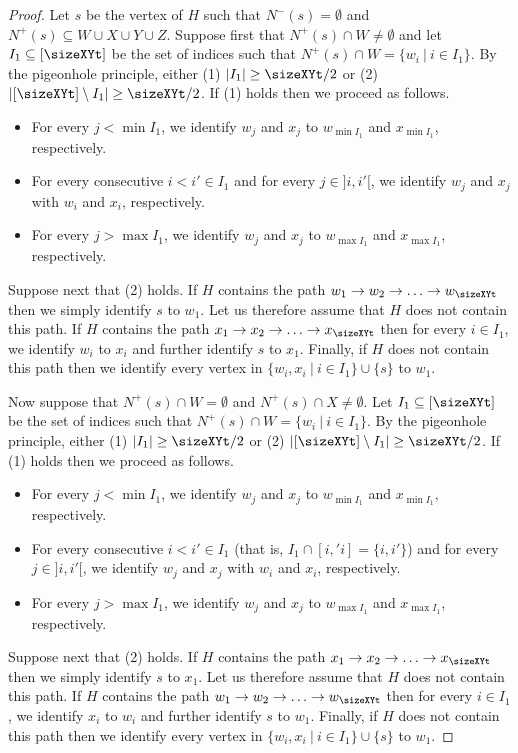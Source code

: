 \begin{proof}
Let $s$ be the vertex of $H$ such that $N^-(s) = \emptyset$ and $N^+(s) \subseteq W \cup X \cup Y \cup Z$.
Suppose first that $N^+(s) \cap W \neq \emptyset$ and let $I_1 \subseteq [\sizeXYt]$ be the set of indices such that $N^+(s) \cap W = \{w_i~|~i \in I_1\}$. By the pigeonhole principle, either (1) $|I_1| \geq \sizeXYt/2$ or (2) $|[\sizeXYt] \setminus I_1| \geq \sizeXYt/2$. If (1) holds then we proceed as follows.
\begin{itemize}
\item For every $j < \min I_1$, we identify $w_j$ and $x_j$ to $w_{\min I_1}$ and $x_{\min I_1}$, respectively.
\item For every consecutive $i < i' \in I_1$ and for every $j \in ]i,i'[$, we identify $w_j$ and $x_j$ with $w_i$ and $x_i$, respectively.
\item For every $j > \max I_1$, we identify $w_j$ and $x_j$ to $w_{\max I_1}$ and $x_{\max I_1}$, respectively. 
\end{itemize}
Suppose next that (2) holds. If $H$ contains the path $w_1 \rightarrow w_2 \rightarrow \ldots \rightarrow w_{\sizeXYt}$ then we simply identify $s$ to $w_1$. Let us therefore assume that $H$ does not contain this path. If $H$ contains the path $x_1 \rightarrow x_2 \rightarrow \ldots \rightarrow x_{\sizeXYt}$ then for every $i \in I_1$, we identify $w_i$ to $x_i$ and further identify $s$ to $x_1$.
Finally, if $H$ does not contain this path then we identify every vertex in $\{w_i,x_i~|~i \in I_1\} \cup \{s\}$ to $w_1$.

Now suppose that $N^+(s) \cap W = \emptyset$ and $N^+(s) \cap X \neq \emptyset$. Let $I_1 \subseteq [\sizeXYt]$ be the set of indices such that $N^+(s) \cap W = \{w_i~|~i \in I_1\}$. By the pigeonhole principle, either (1) $|I_1| \geq \sizeXYt/2$ or (2) $|[\sizeXYt] \setminus I_1| \geq \sizeXYt/2$. If (1) holds then we proceed as follows.
\begin{itemize}
\item For every $j < \min I_1$, we identify $w_j$ and $x_j$ to $w_{\min I_1}$ and $x_{\min I_1}$, respectively.
\item For every consecutive $i < i' \in I_1$ (that is, $I_1 \cap [i,'i]= \{i,i'\}$) and for every $j \in ]i,i'[$, we identify $w_j$ and $x_j$ with $w_i$ and $x_i$, respectively.
\item For every $j > \max I_1$, we identify $w_j$ and $x_j$ to $w_{\max I_1}$ and $x_{\max I_1}$, respectively. 
\end{itemize}
Suppose next that (2) holds. If $H$ contains the path $x_1 \rightarrow x_2 \rightarrow \ldots \rightarrow x_{\sizeXYt}$ then we simply identify $s$ to $x_1$. Let us therefore assume that $H$ does not contain this path. If $H$ contains the path $w_1 \rightarrow w_2 \rightarrow \ldots \rightarrow w_{\sizeXYt}$ then for every $i \in I_1$, we identify $x_i$ to $w_i$ and further identify $s$ to $w_1$. Finally, if $H$ does not contain this path then we identify every vertex in $\{w_i,x_i~|~i \in I_1\} \cup \{s\}$ to $w_1$.


\end{proof}
